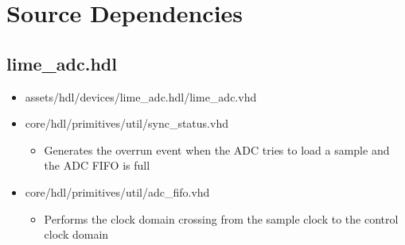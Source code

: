 \documentclass{article}
\def\comp{lime\_adc}
\begin{document}
\section*{Source Dependencies}
\subsection*{\comp.hdl}
\begin{itemize}
	\item assets/hdl/devices/lime\_adc.hdl/lime\_adc.vhd
	\item core/hdl/primitives/util/sync\_status.vhd
	      \begin{itemize}
	      	\item Generates the overrun event when the ADC tries to load a sample and the ADC FIFO is full
	      \end{itemize}
	\item core/hdl/primitives/util/adc\_fifo.vhd
	      \begin{itemize}
	      	\item Performs the clock domain crossing from the sample clock to the control clock domain
	      \end{itemize}
\end{itemize}
\end{document}
